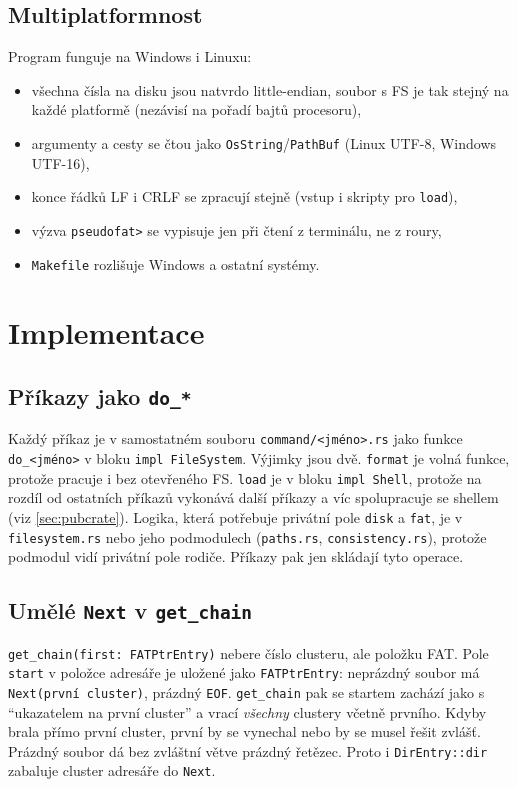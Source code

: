 \documentclass[10pt, a4paper]{report}
\newcommand{\code}[1]{\texttt{#1}}
\begin{document}
	\subsection{Multiplatformnost}
	
	Program funguje na Windows i Linuxu:
	\begin{itemize}
		\item všechna čísla na disku jsou natvrdo little-endian, soubor s FS je tak stejný na
		každé platformě (nezávisí na pořadí bajtů procesoru),
		\item argumenty a cesty se čtou jako \code{OsString}/\code{PathBuf} (Linux UTF-8,
		Windows UTF-16),
		\item konce řádků LF i CRLF se zpracují stejně (vstup i skripty pro \code{load}),
		\item výzva \code{pseudofat>} se vypisuje jen při čtení z terminálu, ne z roury,
		\item \code{Makefile} rozlišuje Windows a ostatní systémy.
	\end{itemize}
	
	\section{Implementace}
	
	\subsection{Příkazy jako \code{do\_*}}
	
	Každý příkaz je v samostatném souboru \code{command/<jméno>.rs} jako funkce \code{do\_<jméno>}
	v bloku \code{impl FileSystem}. Výjimky jsou dvě. \code{format} je volná funkce, protože pracuje i
	bez otevřeného FS. \code{load} je v bloku \code{impl Shell}, protože na rozdíl od ostatních
	příkazů vykonává další příkazy a víc spolupracuje se shellem (viz \ref{sec:pubcrate}). Logika, která potřebuje privátní pole \code{disk} a \code{fat}, je v
	\code{filesystem.rs} nebo jeho podmodulech (\code{paths.rs}, \code{consistency.rs}), protože
	podmodul vidí privátní pole rodiče. Příkazy pak jen skládají tyto operace.
	
	\subsection{Umělé \code{Next} v \code{get\_chain}}
	
	\code{get\_chain(first: FATPtrEntry)} nebere číslo clusteru, ale položku FAT. Pole
	\code{start} v položce adresáře je uložené jako \code{FATPtrEntry}: neprázdný soubor má
	\code{Next(první cluster)}, prázdný \code{EOF}. \code{get\_chain} pak se startem zachází jako
	s \enquote{ukazatelem na první cluster} a vrací \emph{všechny} clustery včetně prvního. Kdyby
	brala přímo první cluster, první by se vynechal nebo by se musel řešit zvlášť. Prázdný soubor
	dá bez zvláštní větve prázdný řetězec. Proto i \code{DirEntry::dir} zabaluje cluster adresáře do
	\code{Next}.
	
\end{document}
